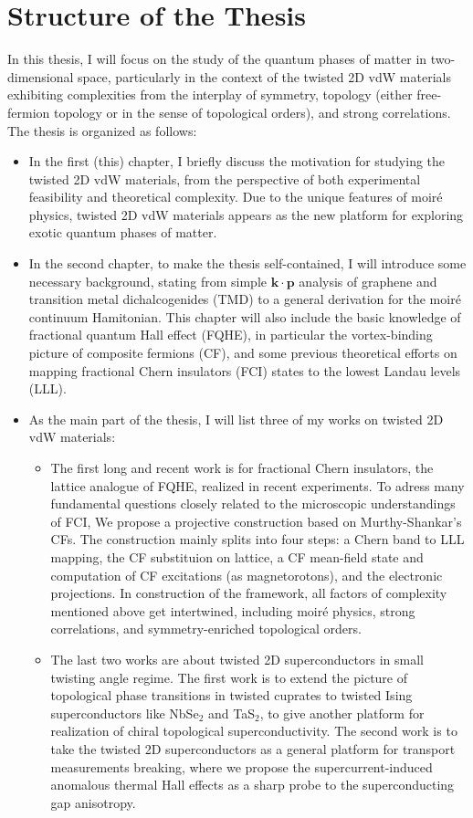 \section{Structure of the Thesis}
In this thesis, I will focus on the study of the quantum phases of matter in two-dimensional space, particularly in the context of the twisted 2D vdW materials exhibiting complexities from the interplay of symmetry, topology (either free-fermion topology or in the sense of topological orders), and strong correlations. The thesis is organized as follows:
\begin{itemize}
    \item In the first (this) chapter, I briefly discuss the motivation for studying the twisted 2D vdW materials, from the perspective of both experimental feasibility and theoretical complexity. Due to the unique features of moir\'e physics, twisted 2D vdW materials appears as the new platform for exploring exotic quantum phases of matter.
    \item In the second chapter, to make the thesis self-contained, I will introduce some necessary background, stating from simple $\bm k\cdot\bm p$ analysis of graphene and transition metal dichalcogenides (TMD) to a general derivation for the moir\'e continuum Hamitonian. This chapter will also include the basic knowledge of fractional quantum Hall effect (FQHE), in particular the vortex-binding picture of composite fermions (CF), and some previous theoretical efforts on mapping fractional Chern insulators (FCI) states to the lowest Landau levels (LLL).
    \item As the main part of the thesis, I will list three of my works on twisted 2D vdW materials:
          \begin{itemize}
              \item The first long and recent work is for fractional Chern insulators, the lattice analogue of FQHE, realized in recent experiments. To adress many fundamental questions closely related to the microscopic understandings of FCI, We propose a projective construction based on Murthy-Shankar's CFs. The construction mainly splits into four steps: a Chern band to LLL mapping, the CF substituion on lattice, a CF mean-field state and computation of CF excitations (as magnetorotons), and the electronic projections. In construction of the framework, all factors of complexity mentioned above get intertwined, including moir\'{e} physics, strong correlations, and symmetry-enriched topological orders.
              \item The last two works are about twisted 2D superconductors in small twisting angle regime. The first work is to extend the picture of topological phase transitions in twisted cuprates to twisted Ising superconductors like NbSe$_2$ and TaS$_2$, to give another platform for realization of chiral topological superconductivity. The second work is to take the twisted 2D superconductors as a general platform for transport measurements breaking, where we propose the supercurrent-induced anomalous thermal Hall effects as a sharp probe to the superconducting gap anisotropy.
          \end{itemize}
\end{itemize}



